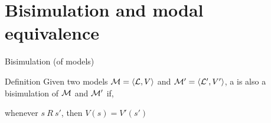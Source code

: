 \documentclass[aspectratio=169]{beamer}
\begin{document}
\section{Bisimulation and modal equivalence}
\begin{slide}{Bisimulation (of models)}\label{s:29}
\begin{block}{Definition}
Given two models $\mathcal{M} = \langle \mathcal{L}, V \rangle$ and $\mathcal{M}' = \langle \mathcal{L}', V' \rangle$, a  is also a \alert{bisimulation of $\mathcal{M}$ and $\mathcal{M}'$} if,
\\
\begin{center}
  whenever $s~R~s'$, then $V(s)= V'(s')$
\end{center}

\end{block}
\end{slide}

\end{document}
